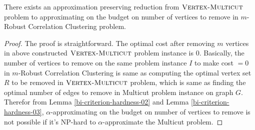 \begin{lemma}\label{bi-criterion-hardness-03}
There exists an approximation preserving reduction from $\textsc{Vertex-Multicut}$ problem to approximating on the budget on number of vertices to remove in $m$-Robust Correlation Clustering problem.
\end{lemma}
\begin{proof}
The proof is straightforward. The optimal cost after removing $m$ vertices in above constructed $\textsc{Vertex-Multicut}$ problem instance is $0$. Basically, the number of vertices to remove on the same problem instance $I$ to make cost $=0$ in $m$-Robust Correlation Clustering is same as computing the optimal vertex set $R$ to be removed in $\textsc{Vertex-Multicut}$ problem, which is same as finding the optimal number of edges to remove in Multicut problem instance on graph $G$. Therefor from Lemma \ref{bi-criterion-hardness-02} and Lemma \ref{bi-criterion-hardness-03}, $\alpha$-approximating on the budget on number of vertices to remove is not possible if it's NP-hard to $\alpha$-approximate the Multicut problem.
\end{proof}